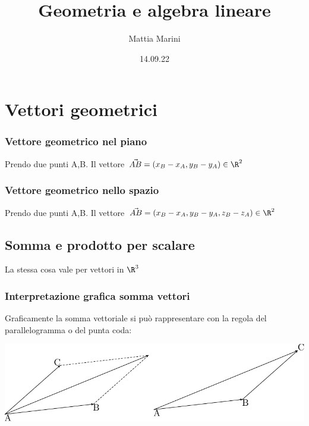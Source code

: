 \documentclass[12pt,a4paper,oneside]{article}
\title{Geometria e algebra lineare}
\author{Mattia Marini}
\date{14.09.22}
\begin{document}
\maketitle
\tableofcontents
\listofdefs
\listoftheorems
\listofincomprensioni


\section{Vettori geometrici}
\subsubsection*{Vettore geometrico nel piano}\phantom{a}

Prendo due punti A,B. Il vettore $\vec{AB} = \left( x_B - x_A, y_B - y_A \right)  \in \R^2$

\subsubsection*{Vettore geometrico nello spazio}\phantom{a}

Prendo due punti A,B. Il vettore $\vec{AB} = \left( x_B - x_A, y_B - y_A, z_B - z_A \right)  \in \R^2$
\subsection{Somma e prodotto per scalare}
La stessa cosa vale per vettori in $\R^{3}$

\subsubsection*{Interpretazione grafica somma vettori}
Graficamente la somma vettoriale si può rappresentare con la regola del parallelogramma o del punta coda:

\begin{center}
	\includegraphics{Images/Somma vettori.pdf}
\end{center}
\end{document}
